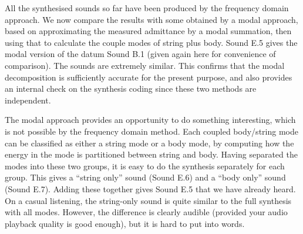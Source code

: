 


  All the synthesised sounds so far have been produced by the frequency domain 
  approach. We now compare the results with some obtained by a modal approach, 
  based on approximating the measured admittance by a modal summation, then 
  using that to calculate the couple modes of string plus body. Sound E.5 gives 
  the modal version of the datum Sound B.1 (given again here for convenience of 
  comparison). The sounds are extremely similar. This confirms that the modal 
  decomposition is sufficiently accurate for the present purpose, and also 
  provides an internal check on the synthesis coding since these two methods 
  are independent. 



  The modal approach provides an opportunity to do something interesting, which 
  is not possible by the frequency domain method. Each coupled body/string mode 
  can be classified as either a string mode or a body mode, by computing how 
  the energy in the mode is partitioned between string and body. Having 
  separated the modes into these two groups, it is easy to do the synthesis 
  separately for each group. This gives a ``string only'' sound (Sound E.6) and 
  a ``body only'' sound (Sound E.7). Adding these together gives Sound E.5 that 
  we have already heard. On a casual listening, the string-only sound is quite 
  similar to the full synthesis with all modes. However, the difference is 
  clearly audible (provided your audio playback quality is good enough), but it 
  is hard to put into words. 

